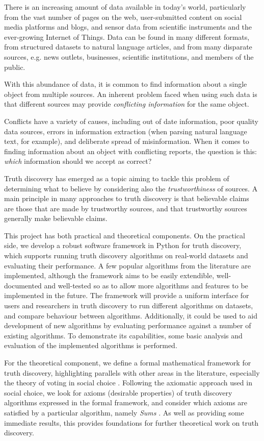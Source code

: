 \documentclass[../main.tex]{subfiles}
\begin{document}
There is an increasing amount of data available in today's world, particularly
from the vast number of pages on the web, user-submitted content on social
media platforms and blogs, and sensor data from scientific instruments and the
ever-growing Internet of Things. Data can be found in many different formats,
from structured datasets to natural language articles, and from many disparate
sources, e.g. news outlets, businesses, scientific institutions, and members of
the public.

With this abundance of data, it is common to find information about a single
object from multiple sources. An inherent problem faced when using such data is
that different sources may provide \emph{conflicting information} for the same
object.

Conflicts have a variety of causes, including out of date information, poor
quality data sources, errors in information extraction (when parsing natural
language text, for example), and deliberate spread of misinformation. When it
comes to finding information about an object with conflicting reports, the
question is this: \emph{which} information should we accept as correct?

Truth discovery has emerged as a topic aiming to tackle this problem of
determining what to believe by considering also the \emph{trustworthiness} of
sources. A main principle in many approaches to truth discovery is that
believable claims are those that are made by trustworthy sources, and that
trustworthy sources generally make believable claims.

This project has both practical and theoretical components. On the practical
side, we develop a robust software framework in Python for truth discovery,
which supports running truth discovery algorithms on real-world datasets and
evaluating their performance. A few popular algorithms from the literature are
implemented, although the framework aims to be easily extendible,
well-documented and well-tested so as to allow more algorithms and features to
be implemented in the future. The framework will provide a uniform interface
for users and researchers in truth discovery to run different algorithms on
datasets, and compare behaviour between algorithms. Additionally, it could be
used to aid development of new algorithms by evaluating performance against a
number of existing algorithms. To demonstrate its capabilities, some basic
analysis and evaluation of the implemented algorithms is performed.

For the theoretical component, we define a formal mathematical framework for
truth discovery, highlighting parallels with other areas in the literature,
especially the theory of voting in social choice \cite{handbook_voting}.
Following the axiomatic approach used in social choice, we look for axioms
(desirable properties) of truth discovery algorithms expressed in the formal
framework, and consider which axioms are satisfied by a particular algorithm,
namely \emph{Sums} \cite{pasternack}. As well as providing some immediate
results, this provides foundations for further theoretical work on truth
discovery.

\end{document}
